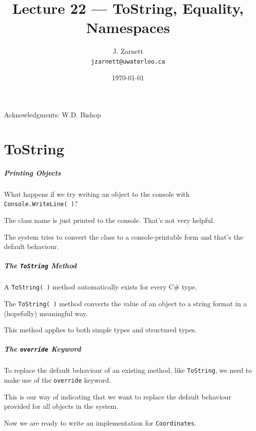 

\title{Lecture 22 --- ToString, Equality, Namespaces}

\author{J. Zarnett\\
\texttt{jzarnett@uwaterloo.ca}}
\date{\today}



\begin{frame}
  \titlepage
  
  \begin{center}
  \small{Acknowledgments: W.D. Bishop}
  \end{center}
\end{frame}

\part{ToString}
\begin{frame}\partpage\end{frame}


\begin{frame}
\frametitle{Printing Objects}

What happens if we try writing  an object to the console with \texttt{Console.WriteLine( )}?

The class name is just printed to the console. That's not very helpful.

The system tries to convert the class to a console-printable form and that's the default behaviour. 

\end{frame}

\begin{frame}
\frametitle{The \texttt{ToString} Method}
A \texttt{ToString( )} method automatically exists for every C\# type.

The \texttt{ToString( )} method converts the value of an object to a string format in a (hopefully) meaningful way.

This method applies to both simple types and structured types.
\end{frame}

\begin{frame}
\frametitle{The \texttt{override} Keyword}
To replace the default behaviour of an existing method, like \texttt{ToString}, we need to make use of the \alert{\texttt{override}} keyword.

This is our way of indicating that we want to replace the default behaviour provided for all objects in the system.

Now we are ready to write an implementation for \texttt{Coordinates}.

\end{frame}



